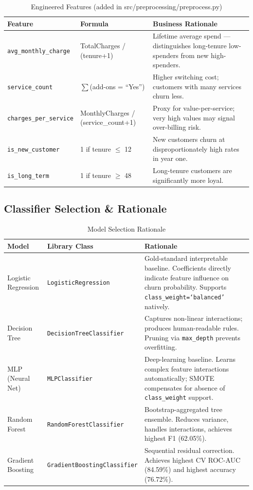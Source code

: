 \documentclass[12pt,a4paper]{article}
\begin{document}
\begin{table}[H]
\centering
\caption{Engineered Features (added in src/preprocessing/preprocess.py)}
\begin{tabularx}{\textwidth}{llX}
    \toprule
    \textbf{Feature} & \textbf{Formula} & \textbf{Business Rationale} \\
    \midrule
    \texttt{avg\_monthly\_charge}  & TotalCharges / (tenure+1) & Lifetime average spend --- distinguishes long-tenure low-spenders from new high-spenders. \\
    \texttt{service\_count}       & $\sum$(add-ons = ``Yes'')  & Higher switching cost; customers with many services churn less. \\
    \texttt{charges\_per\_service} & MonthlyCharges / (service\_count+1) & Proxy for value-per-service; very high values may signal over-billing risk. \\
    \texttt{is\_new\_customer}     & 1 if tenure $\leq$ 12     & New customers churn at disproportionately high rates in year one. \\
    \texttt{is\_long\_term}        & 1 if tenure $\geq$ 48     & Long-tenure customers are significantly more loyal. \\
    \bottomrule
\end{tabularx}
\end{table}

\subsection{Classifier Selection \& Rationale}

\begin{table}[H]
\centering
\caption{Model Selection Rationale}
\begin{tabularx}{\textwidth}{llX}
    \toprule
    \textbf{Model} & \textbf{Library Class} & \textbf{Rationale} \\[4pt]
    \midrule
    Logistic Regression
        & \texttt{LogisticRegression}
        & Gold-standard interpretable baseline. Coefficients directly indicate feature influence on churn probability. Supports \texttt{class\_weight=`balanced'} natively.\\[6pt]
    Decision Tree
        & \texttt{DecisionTreeClassifier}
        & Captures non-linear interactions; produces human-readable rules. Pruning via \texttt{max\_depth} prevents overfitting. \\[6pt]
    MLP (Neural Net)
        & \texttt{MLPClassifier}
        & Deep-learning baseline. Learns complex feature interactions automatically; SMOTE compensates for absence of \texttt{class\_weight} support. \\[6pt]
    Random Forest
        & \texttt{RandomForestClassifier}
        & Bootstrap-aggregated tree ensemble. Reduces variance, handles interactions, achieves highest F1 (62.05\%). \\[6pt]
    Gradient Boosting
        & \texttt{GradientBoostingClassifier}
        & Sequential residual correction. Achieves highest CV ROC-AUC (84.59\%) and highest accuracy (76.72\%). \\
    \bottomrule
\end{tabularx}
\end{table}
\end{document}
